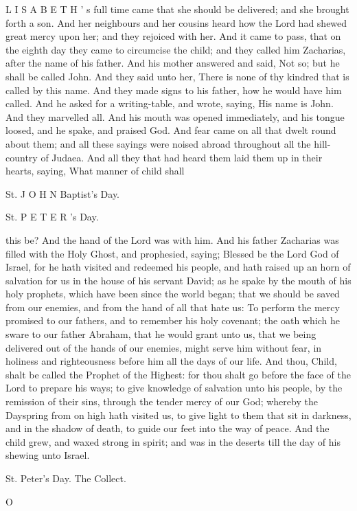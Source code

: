 L I S A B E T H ’ s full time came that she should be delivered; and she brought forth a son. And her neighbours and her cousins heard how the Lord had shewed great mercy upon her; and they rejoiced with her. And it came to pass, that on the eighth day they came to circumcise the child; and they called him Zacharias, after the name of his father. And his mother answered and said, Not so; but he shall be called John. And they said unto her, There is none of thy kindred that is called by this name. And they made signs to his father, how he would have him called. And he asked for a writing-table, and wrote, saying, His name is John. And they marvelled all. And his mouth was opened immediately, and his tongue loosed, and he spake, and praised God. And fear came on all that dwelt round about them; and all these sayings were noised abroad throughout all the hill-country of Judaea. And all they that had heard them laid them up in their hearts, saying, What manner of child shall

St. J O H N Baptist’s Day.

St. P E T E R ’s Day.

this be? And the hand of the Lord was with him. And his father Zacharias was filled with the Holy Ghost, and prophesied, saying; Blessed be the Lord God of Israel, for he hath visited and redeemed his people, and hath raised up an horn of salvation for us in the house of his servant David; as he spake by the mouth of his holy prophets, which have been since the world began; that we should be saved from our enemies, and from the hand of all that hate us: To perform the mercy promised to our fathers, and to remember his holy covenant; the oath which he sware to our father Abraham, that he would grant unto us, that we being delivered out of the hands of our enemies, might serve him without fear, in holiness and righteousness before him all the days of our life. And thou, Child, shalt be called the Prophet of the Highest: for thou shalt go before the face of the Lord to prepare his ways; to give knowledge of salvation unto his people, by the remission of their sins, through the tender mercy of our God; whereby the Dayspring from on high hath visited us, to give light to them that sit in darkness, and in the shadow of death, to guide our feet into the way of peace. And the child grew, and waxed strong in spirit; and was in the deserts till the day of his shewing unto Israel.

St. Peter’s Day. The Collect.

O

